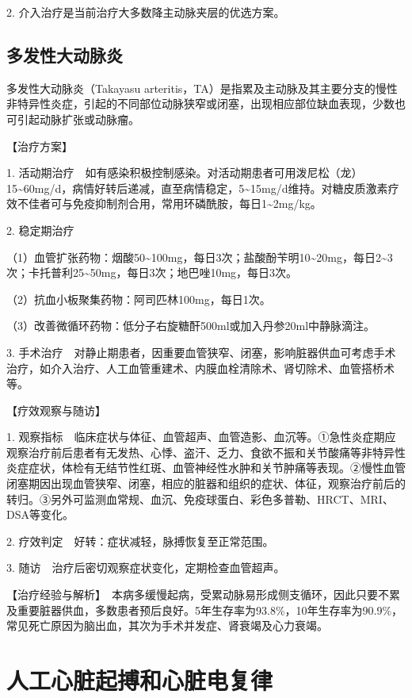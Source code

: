 2. 介入治疗是当前治疗大多数降主动脉夹层的优选方案。

\subsection{多发性大动脉炎}

多发性大动脉炎（Takayasu
arteritis，TA）是指累及主动脉及其主要分支的慢性非特异性炎症，引起的不同部位动脉狭窄或闭塞，出现相应部位缺血表现，少数也可引起动脉扩张或动脉瘤。

【治疗方案】

1.
活动期治疗　如有感染积极控制感染。对活动期患者可用泼尼松（龙）15\textasciitilde{}60mg/d，病情好转后递减，直至病情稳定，5\textasciitilde{}15mg/d维持。对糖皮质激素疗效不佳者可与免疫抑制剂合用，常用环磷酰胺，每日1\textasciitilde{}2mg/kg。

2. 稳定期治疗

（1）血管扩张药物：烟酸50\textasciitilde{}100mg，每日3次；盐酸酚苄明10\textasciitilde{}20mg，每日2\textasciitilde{}3次；卡托普利25\textasciitilde{}50mg，每日3次；地巴唑10mg，每日3次。

（2）抗血小板聚集药物：阿司匹林100mg，每日1次。

（3）改善微循环药物：低分子右旋糖酐500ml或加入丹参20ml中静脉滴注。

3.
手术治疗　对静止期患者，因重要血管狭窄、闭塞，影响脏器供血可考虑手术治疗，如介入治疗、人工血管重建术、内膜血栓清除术、肾切除术、血管搭桥术等。

【疗效观察与随访】

1.
观察指标　临床症状与体征、血管超声、血管造影、血沉等。①急性炎症期应观察治疗前后患者有无发热、心悸、盗汗、乏力、食欲不振和关节酸痛等非特异性炎症症状，体检有无结节性红斑、血管神经性水肿和关节肿痛等表现。②慢性血管闭塞期因出现血管狭窄、闭塞，相应的脏器和组织的症状、体征，观察治疗前后的转归。③另外可监测血常规、血沉、免疫球蛋白、彩色多普勒、HRCT、MRI、DSA等变化。

2. 疗效判定　好转：症状减轻，脉搏恢复至正常范围。

3. 随访　治疗后密切观察症状变化，定期检查血管超声。

【治疗经验与解析】　本病多缓慢起病，受累动脉易形成侧支循环，因此只要不累及重要脏器供血，多数患者预后良好。5年生存率为93.8\%，10年生存率为90.9\%，常见死亡原因为脑出血，其次为手术并发症、肾衰竭及心力衰竭。


\section{人工心脏起搏和心脏电复律}

